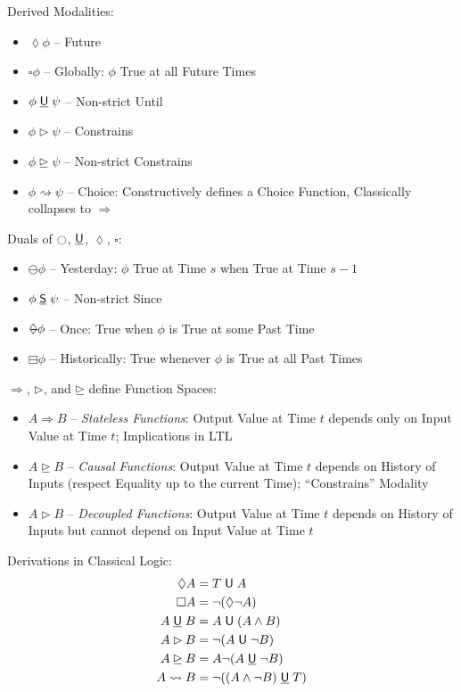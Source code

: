 Derived Modalities:
\begin{itemize}
  \item $\lozenge \phi$ -- Future
  \item $\square \phi$ -- Globally: $\phi$ True at all Future Times
  \item $\phi \;\underline{\mathsf{U}}\; \psi$ -- Non-strict Until
  \item $\phi \rhd \psi$ -- Constrains
  \item $\phi \unrhd \psi$ -- Non-strict Constrains
  \item $\phi \rightsquigarrow \psi$ -- Choice: Constructively defines
    a Choice Function, Classically collapses to $\Rightarrow$
\end{itemize}

Duals of $\ocircle$, $\underline{\mathsf{U}}$, $\lozenge$, $\square$:
\begin{itemize}
  \item $\ominus \phi$ -- Yesterday: $\phi$ True at Time $s$ when True
    at Time $s - 1$
  \item $\phi \;\underline{\mathsf{S}}\; \psi$ -- Non-strict Since
  \item $\minlozenge \phi$ -- Once: True when $\phi$ is True at some
    Past Time
  \item $\boxminus \phi$ -- Historically: True whenever $\phi$ is True
    at all Past Times
\end{itemize}

$\Rightarrow$, $\rhd$, and $\unrhd$ define Function Spaces:
\begin{itemize}
  \item $A \Rightarrow B$ -- \emph{Stateless Functions}: Output Value
    at Time $t$ depends only on Input Value at Time $t$; Implications
    in LTL
  \item $A \unrhd B$ -- \emph{Causal Functions}: Output Value at Time
    $t$ depends on History of Inputs (respect Equality up to the
    current Time); ``Constrains'' Modality
  \item $A \rhd B$ -- \emph{Decoupled Functions}: Output Value at Time
    $t$ depends on History of Inputs but cannot depend on Input Value
    at Time $t$
\end{itemize}

Derivations in Classical Logic:
\begin{align*}
  \lozenge A &= T \;\until\; A \\
  \square A &= \neg(\lozenge\neg A) \\
  A \; \untileq\; B &= A \;\until\; (A \wedge B) \\
  A \rhd B &= \neg(A \;\until\; \neg B) \\
  A \unrhd B &= A \neg(A \;\untileq\; \neg B) \\ %
  A \rightsquigarrow B &= \neg((A \wedge \neg B) \;\untileq\; T)
\end{align*}


